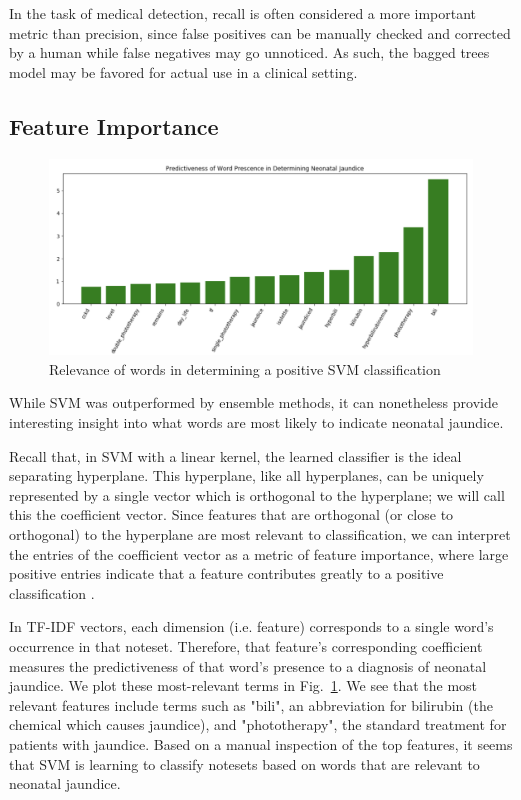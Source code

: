 \documentclass[conference]{IEEEtran}
\begin{document}
In the task of medical detection, recall is often considered a more important metric than precision, since false positives can be manually checked and corrected by a human while false negatives may go unnoticed. As such, the bagged trees model may be favored for actual use in a clinical setting.
\subsection{Feature Importance}
\begin{figure}[htbp]
\centerline{\includegraphics[scale=0.5]{predictiveness}}
\caption{Relevance of words in determining a positive SVM classification}
\label{rel}
\end{figure}
While SVM was outperformed by ensemble methods, it can nonetheless provide interesting insight into what words are most likely to indicate neonatal jaundice.

Recall that, in SVM with a linear kernel, the learned classifier is the ideal separating hyperplane. This hyperplane, like all hyperplanes, can be uniquely represented by a single vector which is orthogonal to the hyperplane; we will call this the coefficient vector. Since features that are orthogonal (or close to orthogonal) to the hyperplane are most relevant to classification, we can interpret the entries of the coefficient vector as a metric of feature importance, where large positive entries indicate that a feature contributes greatly to a positive classification \cite{Guyon}.

In TF-IDF vectors, each dimension (i.e. feature) corresponds to a single word's occurrence in that noteset. Therefore, that feature's corresponding coefficient measures the predictiveness of that word's presence to a diagnosis of neonatal jaundice. We plot these most-relevant terms in Fig.~\ref{rel}.
We see that the most relevant features include terms such as "bili", an abbreviation for bilirubin (the chemical which causes jaundice), and "phototherapy", the standard treatment for patients with jaundice. Based on a manual inspection of the top features, it seems that SVM is learning to classify notesets based on words that are relevant to neonatal jaundice. 
\end{document}
